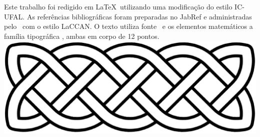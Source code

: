 \documentclass[tcc]{ic}
\begin{document}
% 

\begin{raggedright}
\renewcommand{\bibsection}{
\chapter*{\vspace{-3cm}\centering \Large \textsc{Referências Bibliográficas}}
\addcontentsline{toc}{chapter}{Referências Bibliográficas}
}

\newpage\lhead{\rightmark}
\end{raggedright}


\chapter*{}
\vfill
\singlespacing
\thispagestyle{empty}
\begin{center}
Este trabalho foi redigido em {\large \LaTeX}\ utilizando uma modificação do estilo \textsf{IC-UFAL}.
As referências bibliográficas foram preparadas no \textsf{JabRef} e administradas pelo {\large\BibTeX}\ com o estilo \textsf{LaCCAN}.
O texto utiliza fonte \NomeFonte\ e os elementos matemáticos a família tipográfica \NomeFonteMat, ambas em corpo de 12 pontos.
\vspace{.5cm}
\includegraphics[width=.5\textwidth]{./capitulos/figs/celtic_knot_cross_stitch}
\end{center}
\end{document}
